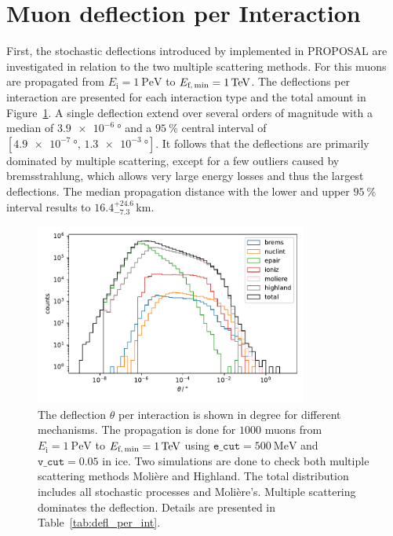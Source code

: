 \section{Muon deflection per Interaction}\label{sec:defl_per_int}
First, the stochastic deflections introduced by \cite{Van_Ginneken} implemented 
in PROPOSAL are investigated in relation to the two multiple scattering methods. 
For this muons are propagated from $E_{\text{i}} = \SI{1}{\peta\electronvolt}$ to $E_{\text{f,\,min}} = \SI{1}{\tera\electronvolt}$.
The deflections per interaction are presented 
for each interaction type and the total amount in Figure~\ref{fig:defl_per_int}. 
A single deflection 
extend over several orders of magnitude with a median of $\SI{3.9e-6}{\degree}$
and a $\SI{95}{\percent}$ central interval of $[\SI{4.9e-7}{\degree}, \,\SI{1.3e-3}{\degree}]$. 
It follows that the deflections are primarily dominated by multiple scattering, except for a few outliers caused by bremsstrahlung, which 
allows very large energy losses and thus the largest deflections.
The median propagation distance with the lower and upper $\SI{95}{\percent}$ 
interval results to $16.4_{-7.3}^{+24.6}\,\si{\kilo\meter}$.

\begin{figure}
    \centering 
    \includegraphics[width=0.8\textwidth]{figures/1PeV_1TeV_1000events_moliere_ecut500_vcut0.05_interpol200_vG_binning_paper.pdf}
    \caption{The deflection $\theta$ per interaction is shown in degree for different mechanisms. The propagation is done for $\num{1000}$ 
    muons from $E_{\text{i}} = \SI{1}{\peta\electronvolt}$ to $E_{\text{f,\,min}} = \SI{1}{\tera\electronvolt}$ using $\texttt{e\_cut} = \SI{500}{\mega\electronvolt}$ and $\texttt{v\_cut} = 0.05$ in ice. Two simulations 
    are done to check both multiple scattering methods Molière and Highland. The total distribution includes all stochastic processes and Molière's. Multiple scattering dominates the deflection. Details are presented in 
    Table~\ref{tab:defl_per_int}.}
    \label{fig:defl_per_int}
\end{figure}

